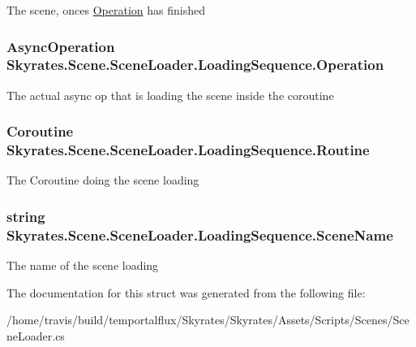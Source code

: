 The scene, onces \hyperlink{struct_skyrates_1_1_scene_1_1_scene_loader_1_1_loading_sequence_a1b6c883f0abf5657766a31dd020faa1a}{Operation} has finished 

\hypertarget{struct_skyrates_1_1_scene_1_1_scene_loader_1_1_loading_sequence_a1b6c883f0abf5657766a31dd020faa1a}{
\subsubsection[{Operation}]{\setlength{\rightskip}{0pt plus 5cm}Async\-Operation Skyrates.\-Scene.\-Scene\-Loader.\-Loading\-Sequence.\-Operation}}\label{struct_skyrates_1_1_scene_1_1_scene_loader_1_1_loading_sequence_a1b6c883f0abf5657766a31dd020faa1a}


The actual async op that is loading the scene inside the coroutine 

\hypertarget{struct_skyrates_1_1_scene_1_1_scene_loader_1_1_loading_sequence_a0dcf79a6448de5293ebe30c457bdfb08}{
\subsubsection[{Routine}]{\setlength{\rightskip}{0pt plus 5cm}Coroutine Skyrates.\-Scene.\-Scene\-Loader.\-Loading\-Sequence.\-Routine}}\label{struct_skyrates_1_1_scene_1_1_scene_loader_1_1_loading_sequence_a0dcf79a6448de5293ebe30c457bdfb08}


The Coroutine doing the scene loading 

\hypertarget{struct_skyrates_1_1_scene_1_1_scene_loader_1_1_loading_sequence_a2284fa04ca8aa448df6b95555a902b8d}{
\subsubsection[{Scene\-Name}]{\setlength{\rightskip}{0pt plus 5cm}string Skyrates.\-Scene.\-Scene\-Loader.\-Loading\-Sequence.\-Scene\-Name}}\label{struct_skyrates_1_1_scene_1_1_scene_loader_1_1_loading_sequence_a2284fa04ca8aa448df6b95555a902b8d}


The name of the scene loading 



The documentation for this struct was generated from the following file\-:\begin{DoxyCompactItemize}
\item 
/home/travis/build/temportalflux/\-Skyrates/\-Skyrates/\-Assets/\-Scripts/\-Scenes/Scene\-Loader.\-cs\end{DoxyCompactItemize}
